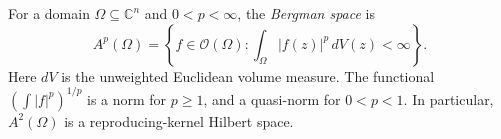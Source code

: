 
For a domain $\Omega\subseteq\mathbb C^n$ and $0<p<\infty$, the \emph{Bergman space} is
\[
A^p(\Omega)=\left\{f\in\mathcal O(\Omega):\int_\Omega|f(z)|^p\,dV(z)<\infty\right\}.
\]
Here $dV$ is the unweighted Euclidean volume measure. The functional $(\int|f|^p)^{1/p}$ is a norm for $p\ge1$, and a quasi-norm for $0<p<1$. In particular, $A^2(\Omega)$ is a reproducing-kernel Hilbert space.
